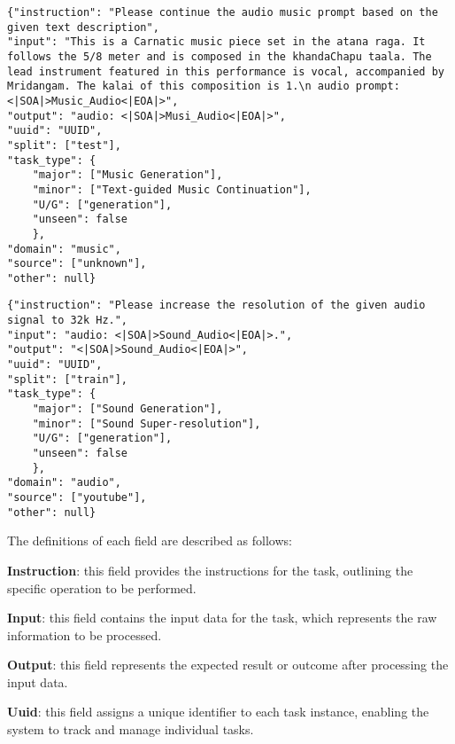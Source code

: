 \begin{tcolorbox}[colback=white, colframe=black, boxrule=0.2mm, arc=0mm, title=Text-guided Music Continuation]
\begin{lstlisting}[basicstyle=\ttfamily, breaklines=true]
{"instruction": "Please continue the audio music prompt based on the given text description", 
"input": "This is a Carnatic music piece set in the atana raga. It follows the 5/8 meter and is composed in the khandaChapu taala. The lead instrument featured in this performance is vocal, accompanied by Mridangam. The kalai of this composition is 1.\n audio prompt: <|SOA|>Music_Audio<|EOA|>", 
"output": "audio: <|SOA|>Musi_Audio<|EOA|>", 
"uuid": "UUID", 
"split": ["test"], 
"task_type": {
    "major": ["Music Generation"], 
    "minor": ["Text-guided Music Continuation"], 
    "U/G": ["generation"], 
    "unseen": false
    }, 
"domain": "music", 
"source": ["unknown"], 
"other": null}
\end{lstlisting}
\end{tcolorbox}




\begin{tcolorbox}[colback=white, colframe=black, boxrule=0.2mm, arc=0mm, title=Sound Super-resolution]
\begin{lstlisting}[basicstyle=\ttfamily, breaklines=true]
{"instruction": "Please increase the resolution of the given audio signal to 32k Hz.", 
"input": "audio: <|SOA|>Sound_Audio<|EOA|>.", 
"output": "<|SOA|>Sound_Audio<|EOA|>", 
"uuid": "UUID", 
"split": ["train"], 
"task_type": {
    "major": ["Sound Generation"], 
    "minor": ["Sound Super-resolution"],
    "U/G": ["generation"], 
    "unseen": false
    }, 
"domain": "audio", 
"source": ["youtube"], 
"other": null}
\end{lstlisting}
\end{tcolorbox}

The definitions of each field are described as follows:

\textbf{Instruction}: this field provides the instructions for the task, outlining the specific operation to be performed.

\textbf{Input}: this field contains the input data for the task, which represents the raw information to be processed.

\textbf{Output}: this field represents the expected result or outcome after processing the input data.

\textbf{Uuid}: this field assigns a unique identifier to each task instance, enabling the system to track and manage individual tasks.

